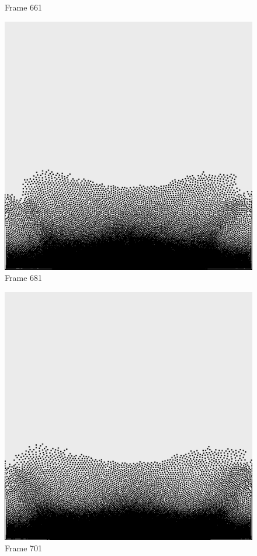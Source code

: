 \documentclass[a4paper, 12pt, oneside]{book}
\begin{document}
\begin{figure}[!ht]
\begin{center}
            Frame 661
        \end{center}
    \endminipage
    \hfill
        \begin{center}
            \includegraphics[width=\linewidth]{images/test_case_1/681.png}
            Frame 681
        \end{center}
    \endminipage
    \hfill
        \begin{center}
            \includegraphics[width=\linewidth]{images/test_case_1/701.png}
            Frame 701
        \end{center}
    \endminipage
    \hfill


\end{figure}
\end{document}

